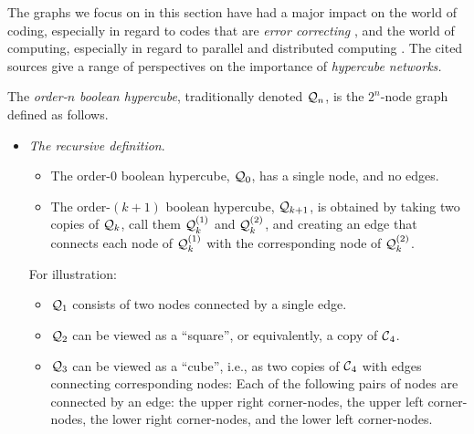 The graphs we focus on in this section have had a major impact on the
world of coding, especially in regard to codes that are {\em error
  correcting} \cite{PetersonW81}, and the world of computing,
especially in regard to parallel and distributed computing
\cite{JohnssonH1989, SaadS89, Schwartz80}.  The cited sources give a
range of perspectives on the importance of {\it hypercube networks.}

The {\it order-$n$ boolean hypercube}, traditionally denoted $\mbox{$\cal Q$}_n$,
is the $2^n$-node graph defined as follows.
\begin{itemize}
\item
{\it The recursive definition}. 
  \begin{itemize}
  \item
The order-$0$ boolean hypercube, $\mbox{$\cal Q$}_0$, has a single node, and no
edges.
  \item
The order-$(k+1)$ boolean hypercube, $\mbox{$\cal Q$}_{k+1}$, is obtained by taking
two copies of $\mbox{$\cal Q$}_k$, call them $\mbox{$\cal Q$}_k^{(1)}$ and $\mbox{$\cal Q$}_k^{(2)}$, and
creating an edge that connects each node of $\mbox{$\cal Q$}_k^{(1)}$ with the
corresponding node of $\mbox{$\cal Q$}_k^{(2)}$.
  \end{itemize}
For illustration:
  \begin{itemize}
  \item
$\mbox{$\cal Q$}_1$ consists of two nodes connected by a single edge.
  \item
$\mbox{$\cal Q$}_2$ can be viewed as a ``square'', or equivalently, a copy of $\mbox{$\cal C$}_4$.
  \item
$\mbox{$\cal Q$}_3$ can be viewed as a ``cube'', i.e., as two copies of $\mbox{$\cal C$}_4$
    with edges connecting corresponding nodes: Each of the following
    pairs of nodes are connected by an edge: the upper right
    corner-nodes, the upper left corner-nodes, the lower right
    corner-nodes, and the lower left corner-nodes.
  \end{itemize}


\end{itemize}
